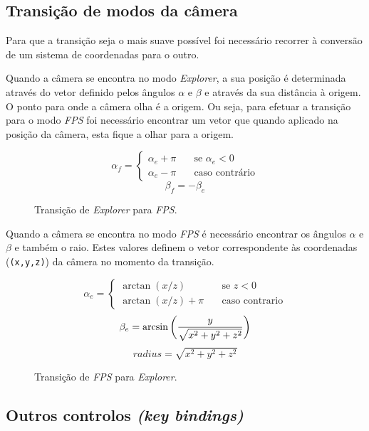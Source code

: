 \documentclass[a4paper]{article}
\begin{document}
\subsection{Transição de modos da câmera}

Para que a transição seja o mais suave possível foi necessário recorrer à conversão de um sistema de coordenadas para o outro.

Quando a câmera se encontra no modo \textit{Explorer}, a sua posição é determinada através do vetor definido pelos ângulos $\alpha$ e $\beta$ e através da sua distância à origem. O ponto para onde a câmera olha é a origem. Ou seja, para efetuar a transição para o modo \textit{FPS} foi necessário encontrar um vetor que quando aplicado na posição da câmera, esta fique a olhar para a origem.

\begin{figure}[H]
    \[
        \alpha_f =
        \begin{cases}
            \alpha_e + \pi & \quad \text{se } \alpha_e < 0\\
            \alpha_e - \pi & \quad \text{caso contrário}
        \end{cases}
    \]
    \[
        \beta_f = -\beta_e
    \]
    \caption{Transição de \textit{Explorer} para \textit{FPS}.}
\end{figure}

Quando a câmera se encontra no modo \textit{FPS} é necessário encontrar os ângulos $\alpha$ e $\beta$ e também o raio. Estes valores definem o vetor correspondente às coordenadas (\texttt{(x,y,z)}) da câmera no momento da transição.

\begin{figure}[H]
    \[
        \alpha_e =
        \begin{cases}
            \arctan(x / z)       & \quad \text{se } z < 0\\
            \arctan(x / z) + \pi & \quad \text{caso contrario}
        \end{cases}
    \]
    \[
        \beta_e = \arcsin\bigg(\frac{y}{\sqrt{x^2 + y^2 + z^2}}\bigg)\\
    \]
    \[        radius = \sqrt{x^2 + y^2 + z^2}
    \]
    \caption{Transição de \textit{FPS} para \textit{Explorer}.}
\end{figure}

\subsection{Outros controlos \textit{(key bindings)}}
\end{document}
